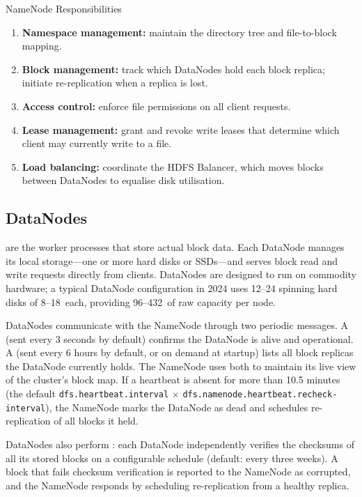 \begin{defbox}{NameNode Responsibilities}
\begin{enumerate}
  \item \textbf{Namespace management:} maintain the directory tree and
        file-to-block mapping.
  \item \textbf{Block management:} track which DataNodes hold each
        block replica; initiate re-replication when a replica is lost.
  \item \textbf{Access control:} enforce file permissions on all client
        requests.
  \item \textbf{Lease management:} grant and revoke write leases that
        determine which client may currently write to a file.
  \item \textbf{Load balancing:} coordinate the HDFS Balancer, which
        moves blocks between DataNodes to equalise disk utilisation.
\end{enumerate}
\end{defbox}

\subsection{DataNodes}
\label{subsec:datanodes}

 are the worker processes that store actual block data.
Each DataNode manages its local storage---one or more hard disks or
SSDs---and serves block read and write requests directly from clients.
DataNodes are designed to run on commodity hardware; a typical DataNode
configuration in 2024 uses 12--24 spinning hard disks of 8--18\TB\
each, providing 96--432\TB\ of raw capacity per node.

DataNodes communicate with the NameNode through two periodic messages.
A \term{heartbeat} (sent every 3 seconds by default) confirms the
DataNode is alive and operational. A \term{block report} (sent every 6
hours by default, or on demand at startup) lists all block replicas the
DataNode currently holds. The NameNode uses both to maintain its live
view of the cluster's block map. If a heartbeat is absent for more than
10.5 minutes (the default \texttt{dfs.heartbeat.interval} $\times$
\texttt{dfs.namenode.heartbeat.recheck-interval}), the NameNode marks
the DataNode as dead and schedules re-replication of all blocks it held.

DataNodes also perform : each DataNode
independently verifies the checksums of all its stored blocks on a
configurable schedule (default: every three weeks). A block that fails
checksum verification is reported to the NameNode as corrupted, and
the NameNode responds by scheduling re-replication from a healthy
replica.

